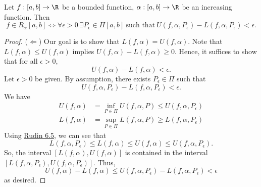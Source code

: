 \begin{theorem}\label{Rudin 6.6}
    Let \( f: [a,b] \to \R  \) be a bounded function, \( \alpha : [a,b] \to \R  \) be an increasing function. Then
    \[  f \in {R}_{\alpha}[a,b] \iff \forall \epsilon > 0 \ \exists {P}_{\epsilon} \in \Pi [a,b] \ \text{such that} \ U(f,\alpha, {P}_{\epsilon}) - L(f,\alpha, {P}_{\epsilon}) < \epsilon.  \]
\end{theorem}
\begin{proof}
    (\( \Longleftarrow \)) Our goal is to show that \( L(f,\alpha) = U(f,\alpha) \). Note that \( L(f,\alpha) \leq U(f,\alpha) \) implies \( U(f,\alpha) - L(f,\alpha) \geq 0  \). Hence, it suffices to show that for all \( \epsilon > 0  \), 
    \[  U(f,\alpha) - L(f,\alpha) < \epsilon. \]
    Let \( \epsilon > 0  \) be given. By assumption, there exists \( {P}_{\epsilon} \in \Pi \) such that 
    \[  U(f,\alpha, {P}_{\epsilon}) - L(f,\alpha, {P}_{\epsilon}) < \epsilon. \]
    We have
    \begin{align*}
        U(f,\alpha) &= \inf_{P \in \Pi} U(f,\alpha,P) \leq U(f,\alpha, {P}_{\epsilon}) \\
        L(f,\alpha) &= \sup_{P \in \Pi} L(f,\alpha,P)  \geq L(f,\alpha, {P}_{\epsilon})
    \end{align*}
    Using {\hyperref[Theorem 3]{Rudin 6.5}}, we can see that 
    \[ L(f,\alpha,{P}_{\epsilon}) \leq L(f,\alpha) \leq U(f,\alpha) \leq U(f,\alpha, {P}_{\epsilon}).  \]
    So, the interval \( [L(f,\alpha), U(f,\alpha)] \) is contained in the interval \( [L(f,\alpha, {P}_{\epsilon}), U(f,\alpha, {P}_{\epsilon})] \). Thus, 
    \[ U(f,\alpha) - L(f,\alpha) \leq U(f,\alpha, {P}_{\epsilon}) - L(f,\alpha, {P}_{\epsilon}) < \epsilon \]
    as desired.
    

\end{proof}
